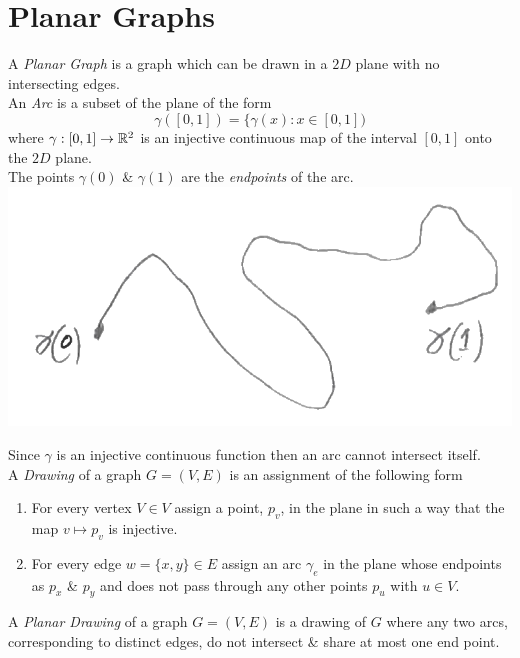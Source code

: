 \documentclass[11pt,a4paper]{article}
\begin{document}
\section{Planar Graphs}

A \textit{Planar Graph} is a graph which can be drawn in a $2D$ plane with no intersecting edges.\\

An \textit{Arc} is a subset of the plane of the form
$$\gamma([0,1])=\{\gamma(x):x\in[0,1])$$
where $\gamma:[0,1]\to\mathbb{R}^2$ is an injective continuous map of the interval $[0,1]$ onto the $2D$ plane.\\
\nb The points $\gamma(0)$ \& $\gamma(1)$ are the \textit{endpoints} of the arc.\\

\includegraphics[scale=0.3]{img/arc.png}

Since $\gamma$ is an injective continuous function then an arc cannot intersect itself.\\

A \textit{Drawing} of a graph $G=(V,E)$ is an assignment of the following form
\begin{enumerate}[label=\roman*)]
	\item For every vertex $V\in V$ assign a point, $p_v$, in the plane in such a way that the map $v\mapsto p_v$ is injective.
	\item For every edge $w=\{x,y\}\in E$ assign an arc $\gamma_e$ in the plane whose endpoints as $p_x$ \& $p_y$ and does not pass through any other points $p_u$ with $u\in V$.\\
\end{enumerate}

A \textit{Planar Drawing} of a graph $G=(V,E)$ is a drawing of $G$ where any two arcs, corresponding to distinct edges, do not intersect \& share at most one end point.\\
\end{document}
